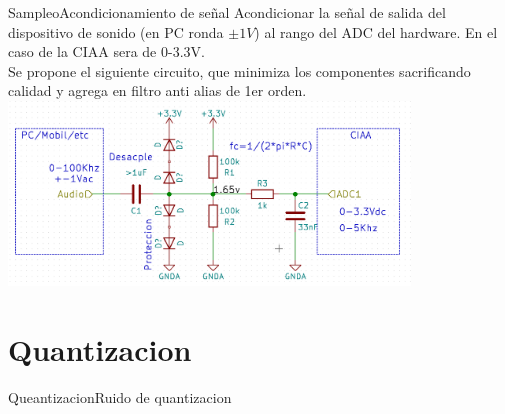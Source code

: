 \begin{darkframes}
   \begin{frame}{Sampleo}{Acondicionamiento de señal}
      Acondicionar la señal de salida del dispositivo de sonido (en PC ronda $\pm1V$) al rango del ADC del hardware. En el caso de la CIAA sera de 0-3.3V. \\ Se propone el siguiente circuito, que minimiza los componentes sacrificando calidad y agrega en filtro anti alias de 1er orden.
      \protoboardicon
      \center\includegraphics[width=0.8\textwidth]{1_clase/circuito}
      \vfill
   \end{frame}


   \section{Quantizacion}
   \begin{frame}{Queantizacion}{Ruido de quantizacion}
      \vfill
   \end{frame}





















































\end{darkframes}
